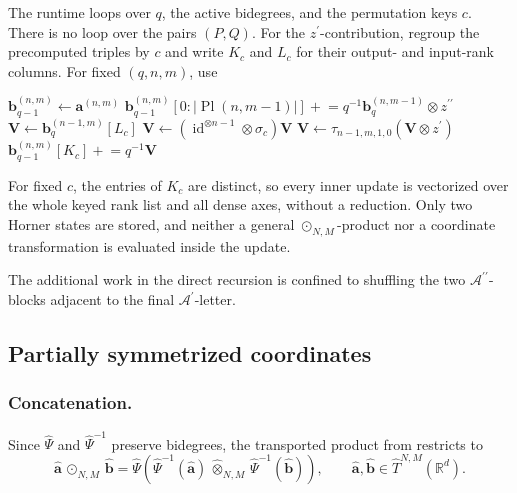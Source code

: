 \documentclass{amsart}
\theoremstyle{definition}
\theoremstyle{remark}
\begin{document}
\begin{implrmk}
The runtime loops over $q$, the active bidegrees, and the permutation keys
$c$. There is no loop over the pairs $(P,Q)$. For the
$z^{\prime}$-contribution, regroup the precomputed triples by $c$ and write
$K_c$ and $L_c$ for their output- and input-rank columns. For fixed
$(q,n,m)$, use
\begin{algorithmic}[1]
\State $\mathbf{b}_{q-1}^{(n,m)}
    \gets\mathbf{a}^{(n,m)}$
    \State $\mathbf{b}_{q-1}^{(n,m)}
        [0:|\operatorname{Pl}(n,m-1)|]
        \mathrel{+}=
        q^{-1}\mathbf{b}_{q}^{(n,m-1)}
        \otimes z^{\prime\prime}$
\EndIf
{}
        \State $\mathbf{V}\gets
            \mathbf{b}_{q}^{(n-1,m)}[L_c]$
        \State $\mathbf{V}\gets
            (\operatorname{id}^{\otimes n-1}\otimes\sigma_c)\mathbf{V}$
        \State $\mathbf{V}\gets
            \tau_{n-1,m,1,0}
            (\mathbf{V}\otimes z^{\prime})$
        \State $\mathbf{b}_{q-1}^{(n,m)}[K_c]
            \mathrel{+}=q^{-1}\mathbf{V}$
    \EndFor
\EndIf
\end{algorithmic}
For fixed $c$, the entries of $K_c$ are distinct, so every inner update is
vectorized over the whole keyed rank list and all dense axes, without a
reduction. Only two Horner states are stored, and neither a general
$\odot_{N,M}$-product nor a coordinate transformation is evaluated inside
the update.
\end{implrmk}

The additional work in the direct recursion is confined to shuffling the two
$\mathcal{A}^{\prime\prime}$-blocks adjacent to the final
$\mathcal{A}^{\prime}$-letter.

\subsection{Partially symmetrized coordinates}

\subsubsection{Concatenation.}
\label{sec:symmetrized_shear_concat}

Since $\widehat{\Psi}$ and $\widehat{\Psi}^{-1}$ preserve bidegrees, the
transported product from 
restricts to
\[
    \widehat{\mathbf{a}}
    \,\widehat{\odot}_{N,M}\,
    \widehat{\mathbf{b}}
    =
    \widehat{\Psi}
    \left(
        \widehat{\Psi}^{-1}(\widehat{\mathbf{a}})
        \,\widehat{\otimes}_{N,M}\,
        \widehat{\Psi}^{-1}(\widehat{\mathbf{b}})
    \right),
    \qquad
    \widehat{\mathbf{a}},\widehat{\mathbf{b}}
    \in
    \widehat{T}^{N,M}(\mathbb{R}^d).
\]
\end{document}
